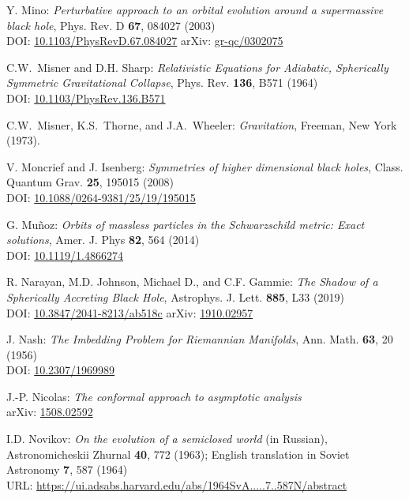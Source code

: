 \begin{thebibliography}{123}
Y. Mino:
{\em Perturbative approach to an orbital evolution around a supermassive black hole},
Phys. Rev. D {\bf 67}, 084027 (2003)\\
DOI: \href{https://doi.org/10.1103/PhysRevD.67.084027}{10.1103/PhysRevD.67.084027}\hfill
arXiv: \href{https://arxiv.org/abs/gr-qc/0302075}{gr-qc/0302075}

C.W.~Misner and D.H. Sharp:
{\em Relativistic Equations for Adiabatic, Spherically Symmetric Gravitational Collapse},
Phys. Rev. {\bf 136}, B571 (1964)\\
DOI: \href{https://doi.org/10.1103/PhysRev.136.B571}{10.1103/PhysRev.136.B571}

C.W.~Misner, K.S.~Thorne, and J.A.~Wheeler: {\em Gravitation},
Freeman, New York (1973).

V. Moncrief and J. Isenberg:
{\em Symmetries of higher dimensional black holes},
Class. Quantum Grav. {\bf 25}, 195015 (2008)\\
DOI: \href{https://doi.org/10.1088/0264-9381/25/19/195015}{10.1088/0264-9381/25/19/195015}

G. Mu\~noz:
{\em Orbits of massless particles in the Schwarzschild metric: Exact solutions},
Amer. J. Phys {\bf 82}, 564 (2014)\\
DOI: \href{https://doi.org/10.1119/1.4866274}{10.1119/1.4866274}

R. Narayan, M.D. Johnson, Michael D., and C.F. Gammie:
{\em The Shadow of a Spherically Accreting Black Hole},
Astrophys. J. Lett. {\bf 885}, L33 (2019)\\
DOI: \href{https://doi.org/10.3847/2041-8213/ab518c}{10.3847/2041-8213/ab518c}\hfill
arXiv: \href{https://arxiv.org/abs/1910.02957}{1910.02957}

J. Nash:
{\em The Imbedding Problem for Riemannian Manifolds},
Ann. Math. {\bf 63}, 20 (1956)\\
DOI: \href{https://doi.org/10.2307/1969989}{10.2307/1969989}

J.-P. Nicolas:
{\em The conformal approach to asymptotic analysis} \\
arXiv: \href{https://arxiv.org/abs/1508.02592}{1508.02592}

I.D. Novikov:
{\em On the evolution of a semiclosed world} (in Russian),
Astronomicheskii Zhurnal {\bf 40}, 772 (1963); English translation in
Soviet Astronomy {\bf 7}, 587 (1964)\\
URL: \url{https://ui.adsabs.harvard.edu/abs/1964SvA.....7..587N/abstract}


\end{thebibliography}

